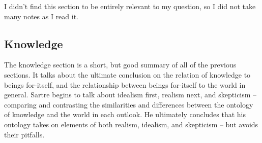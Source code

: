 \noindent
{}

\noindent
I didn't find this section to be entirely relevant to my question, so I did not take many notes as I read it.

\subsection{Knowledge}

The knowledge section \autocite[300 -- 303]{sartre} is a short, but good summary of all of the previous sections. It talks about the ultimate conclusion on the relation of knowledge to beings for-itself, and the relationship between beings for-itself to the world in general. Sartre begins to talk about idealism first, realism next, and skepticism -- comparing and contrasting the similarities and differences between the ontology of knowledge and the world in each outlook. He ultimately concludes that his ontology takes on elements of both realism, idealism, and skepticism -- but avoids their pitfalls.

